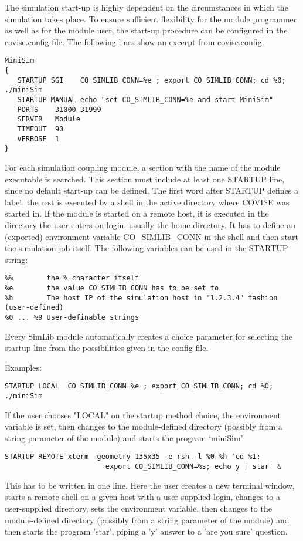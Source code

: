 \begin{htmlonly}
The simulation start-up is highly dependent on the circumstances in which the simulation 
takes place. To ensure sufficient flexibility for the module programmer as well as for 
the module user, the start-up procedure can be configured in the covise.config file. 
The following lines show an excerpt from covise.config.

\begin{verbatim}
MiniSim
{
   STARTUP SGI    CO_SIMLIB_CONN=%e ; export CO_SIMLIB_CONN; cd %0; ./miniSim
   STARTUP MANUAL echo "set CO_SIMLIB_CONN=%e and start MiniSim"
   PORTS    31000-31999
   SERVER   Module
   TIMEOUT  90
   VERBOSE  1
}
\end{verbatim}

For each simulation coupling module, a section with the name of the module executable 
is searched. This section must include at least one STARTUP line, since no default 
start-up can be defined. The first word after STARTUP defines a label, the rest is 
executed by a shell in the active directory where COVISE was started in. If the module 
is started on a remote host, it is executed in the directory the user enters on login, 
usually the home directory. It has to define an (exported) environment variable 
CO\_SIMLIB\_CONN in the shell and then start the simulation job itself. The following
variables can be used in the STARTUP string:

\begin{verbatim}
%%        the % character itself
%e        the value CO_SIMLIB_CONN has to be set to
%h        The host IP of the simulation host in "1.2.3.4" fashion (user-defined)
%0 ... %9 User-definable strings
\end{verbatim}

Every SimLib module automatically creates a choice parameter for selecting the startup 
line from the possibilities given in the config file.

Examples:

\begin{verbatim}
STARTUP LOCAL  CO_SIMLIB_CONN=%e ; export CO_SIMLIB_CONN; cd %0; ./miniSim
\end{verbatim}

If the user chooses "LOCAL" on the startup method choice, the environment variable is 
set, then changes to the module-defined directory (possibly from a string parameter of 
the module) and starts the program `miniSim'.

\begin{verbatim}
STARTUP REMOTE xterm -geometry 135x35 -e rsh -l %0 %h 'cd %1;
                        export CO_SIMLIB_CONN=%s; echo y | star' &
\end{verbatim}
This has to be written in one line. Here the user creates a new terminal window, starts 
a remote shell on a given host with a user-supplied login, changes to a user-supplied 
directory, sets the environment variable, then changes to the module-defined directory 
(possibly from a string parameter of the module) and then starts the program 'star', 
piping a 'y' answer to a 'are you sure' question.


\end{htmlonly}
